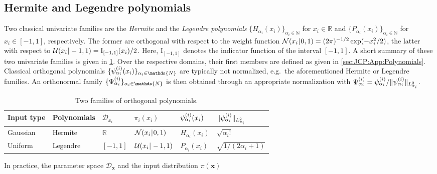 \subsection{Hermite and Legendre polynomials}
Two classical univariate families are the \emph{Hermite} and the \emph{Legendre polynomials} \(\{H_{\alpha_i}(x_i)\}_{\alpha_i \in \mathds{N}}\) for \(x_i \in \mathds{R}\)
and \(\{P_{\alpha_i}(x_i)\}_{\alpha_i \in \mathds{N}}\) for \(x_i \in [-1,1]\), respectively.
The former are orthogonal with respect to the weight function \(\mathcal{N}(x_i {\:\!}|{\:\!} 0,1) = (2 \pi)^{-1/2} \exp(-x_i^2/2) \),
the latter with respect to \(\mathcal{U}(x_i {\:\!}|{\:\!} -1,1) = \mathrm{I}_{[-1,1]}(x_i) / 2\).
Here, \(\mathrm{I}_{[-1,1]}\) denotes the indicator function of the interval \([-1,1]\).
A short summary of these two univariate families is given in \cref{tab:JCP:PCE:UnivariateFamilies}.
Over the respective domains, their first members are defined as given in \cref{sec:JCP:App:Polynomials}.
Classical orthogonal polynomials \(\{\basisU_{\alpha_i}^{(i)}(x_i)\}_{\alpha_i \in \mathds{N}}\) are typically not normalized, e.g.\ the aforementioned Hermite or Legendre families.
An orthonormal family \(\{\basis^{(i)}_{\alpha_i}\}_{\alpha_i \in \mathds{N}}\) is then obtained
through an appropriate normalization with \(\Psi^{(i)}_{\alpha_i} = \psi^{(i)}_{\alpha_i} / \lVert \psi^{(i)}_{\alpha_i} \rVert_{L_{\pi_i}^2}\).
\begin{table}[htb]
  \caption[Two families of orthogonal polynomials]{Two families of orthogonal polynomials.}
  \label{tab:JCP:PCE:UnivariateFamilies}
  \centering
    \begin{tabular}{llllll}
      \toprule
      Input type & Polynomials & \multicolumn{1}{l}{\(\mathcal{D}_{x_i}\)} & \multicolumn{1}{l}{\(\pi_i(x_i)\)}
      & \multicolumn{1}{l}{\(\psi^{(i)}_{\alpha_i}(x_i)\)} & \multicolumn{1}{l}{\(\lVert \psi^{(i)}_{\alpha_i} \rVert_{L_{\pi_i}^2}\)} \\
      \midrule
      Gaussian & Hermite  & \(\mathds{R}\) & \(\mathcal{N}(x_i {\:\!}|{\:\!} 0,1)\)  & \(H_{\alpha_i}(x_i)\) & \(\sqrt{\alpha_i !}\)         \\
      Uniform  & Legendre & \([-1,1]\)     & \(\mathcal{U}(x_i {\:\!}|{\:\!} -1,1)\) & \(P_{\alpha_i}(x_i)\) & \(\sqrt{1/(2 \alpha_i + 1)}\) \\
      \bottomrule
    \end{tabular}
\end{table}
\par %
In practice, the parameter space \(\mathcal{D}_{\bm{x}}\) and the input distribution \(\pi(\bm{x})\)
